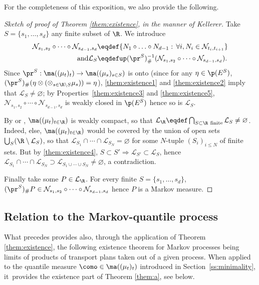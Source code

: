 For the completeness of this exposition, we also provide the following.

\begin{proof}[Sketch of proof of Theorem \ref{them:existence}, in the manner of Kellerer]\label{proof:them:existence} Take $S=\{s_1,\ldots,s_d\}$ any finite subset of $\R$. We introduce
\begin{align*}
\mathcal{N}_{s_1,s_2}\circ\cdots\circ\mathcal{N}_{s_{d-1},s_d}&\eqdef\{N_1\circ\ldots\circ N_{d-1}:\,\forall i, N_i\in\mathcal{N}_{t_i,t_{i+1}}\}\\
\tag*{and}
\mathcal{L}_S&\eqdefup(\pr^S)_\#^{-1}(\mathcal{N}_{s_1,s_2}\circ\cdots\circ\mathcal{N}_{s_{d-1},s_d}).
\end{align*}
Since $\pr^S:\ma((\mu_t)_t)\to\ma((\mu_s)_{s\in S})$ is onto (since for any $\eta\in\p(E^S)$, $(\pr^S)_\#(\eta\otimes(\otimes_{s\in \R\setminus S}\mu_s))=\eta$), \eqref{them:existence1} and \eqref{them:existence2} imply that $\mathcal{L}_S\neq\varnothing$; by Properties~\eqref{them:existence3} and \eqref{them:existence5}, $\mathcal{N}_{s_1,s_2}\circ\cdots\circ\mathcal{N}_{s_{d-1},s_d}$ is weakly closed in $\p(E^S)$ hence so is $\mathcal{L}_S$.

By \cite[\S 1.2]{Ke72} or \cite[\S 2]{BHS}, $\ma((\mu_t)_{t\in \R})$ is weakly compact, so that $\mathcal{L}_\R\eqdef\bigcap_{S\subset \R\ \text{finite}}\mathcal{L}_S\neq\varnothing$. Indeed, else, $\ma((\mu_t)_{t\in \R})$ would be covered by the union of open sets $\bigcup_S(\R\setminus\mathcal{L}_S)$, so that $\mathcal{L}_{S_1}\cap\cdots \cap \mathcal{L}_{S_N}=\varnothing$ for some $N$-tuple $(S_i)_{i\leq N}$ of finite sets. But by \eqref{them:existence4}, $S\subset S'\Rightarrow \mathcal{L}_{S'}\subset \mathcal{L}_{S}$, hence $\mathcal{L}_{S_1}\cap\cdots \cap \mathcal{L}_{S_N}\supset\mathcal{L}_{S_1\cup\cdots\cup S_N}\neq\varnothing$, a contradiction.

Finally take some $P\in\mathcal{L}_\R$. For every finite $S=\{s_1,\ldots,s_d\}$, $(\pr^S)_\#P\in\mathcal{N}_{s_1,s_2}\circ\cdots\circ\mathcal{N}_{s_{d-1},s_d}$ hence $P$ is a Markov measure.
\end{proof}

\subsection{Relation to the Markov-quantile process}\label{subsec:markovinification}

What precedes provides also, through the application of Theorem \ref{them:existence}, the following existence theorem for Markov processes being limits of products of transport plans taken out of a given process. When applied to the quantile measure $\como\in\ma((\mu_t)_t)$ introduced in Section~\ref{ss:minimality}, it~provides the existence part of Theorem \ref{them:a}, see below.

